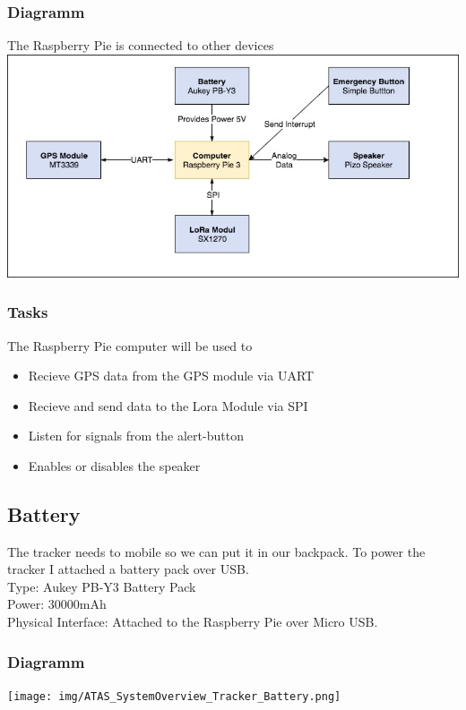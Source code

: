 \documentclass[a4paper,11pt, oneside]{report}
\theoremstyle{definition}
\begin{document}
\subsubsection{Diagramm}
The Raspberry Pie is connected to other devices\\[0.3cm]
\includegraphics[width=\textwidth]{img/ATAS_SystemOverview_Tracker_Computer.jpg}

\subsubsection{Tasks}
The Raspberry Pie computer will be used to
\begin{itemize}
\item Recieve GPS data from the GPS module via UART
\item Recieve and send data to the Lora Module via SPI
\item Listen for signals from the alert-button
\item Enables or disables the speaker
\end{itemize}


\newpage
\subsection{Battery}
The tracker needs to mobile so we can put it in our backpack. To power the tracker I attached a battery pack over USB.\\[0.3cm]
Type: Aukey PB-Y3 Battery Pack\\
Power: 30000mAh\\
Physical Interface: Attached to the Raspberry Pie over Micro USB.
\subsubsection{Diagramm}
\texttt{[image: img/ATAS\_SystemOverview\_Tracker\_Battery.png]}
\end{document}

